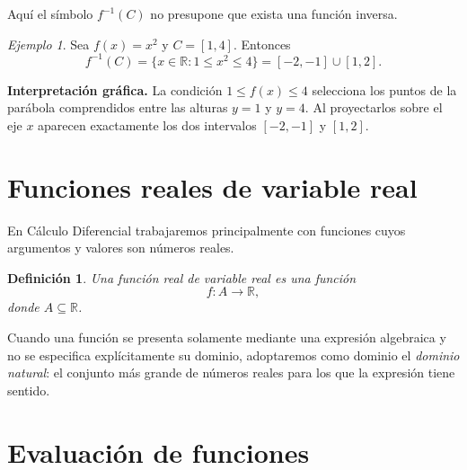 \documentclass[12pt]{article}
\newtheorem{definicion}{Definición}[section]
\theoremstyle{remark}
\newtheorem{ejemplo}{Ejemplo}[section]
\newcommand{\R}{\mathbb{R}}
\begin{document}
Aquí el símbolo $f^{-1}(C)$ no presupone que exista una función inversa.

\begin{ejemplo}
Sea $f(x)=x^2$ y $C=[1,4]$. Entonces
\[
f^{-1}(C)=\{x\in\R:1\leq x^2\leq4\}
=[-2,-1]\cup[1,2].
\]

\textbf{Interpretación gráfica.} La condición $1\leq f(x)\leq4$ selecciona
los puntos de la parábola comprendidos entre las alturas $y=1$ y $y=4$.
Al proyectarlos sobre el eje $x$ aparecen exactamente los dos intervalos
$[-2,-1]$ y $[1,2]$.
\begin{center}
\end{center}
\end{ejemplo}

\section{Funciones reales de variable real}

En Cálculo Diferencial trabajaremos principalmente con funciones cuyos
argumentos y valores son números reales.

\begin{definicion}
Una función real de variable real es una función
\[
f:A\to\R,
\]
donde $A\subseteq\R$.
\end{definicion}

Cuando una función se presenta solamente mediante una expresión algebraica y
no se especifica explícitamente su dominio, adoptaremos como dominio el
\emph{dominio natural}: el conjunto más grande de números reales para los que
la expresión tiene sentido.

\section{Evaluación de funciones}
\end{document}
